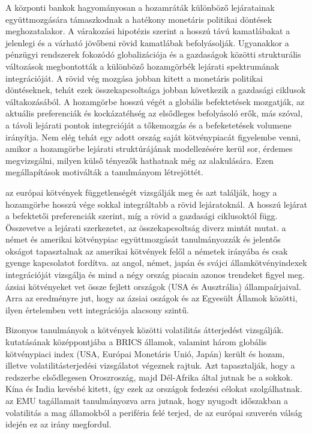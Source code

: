 \documentclass[12pt,bibliography=totoc]{article}
\begin{document}
A központi bankok hagyományosan a hozamráták különböző lejáratainak együttmozgására támaszkodnak a hatékony monetáris politikai döntések meghozatalakor. A várakozási hipotézis szerint a hosszú távú kamatlábakat a jelenlegi és a várható jövőbeni rövid kamatlábak befolyásolják. Ugyanakkor a pénzügyi rendszerek fokozódó globalizációja és a gazdaságok közötti strukturális változások megbontották a különböző hozamgörbék lejárati spektrumának integrációját. A rövid vég mozgása jobban kitett a monetáris politikai döntéseknek, tehát ezek összekapcsoltsága jobban következik a gazdasági ciklusok váltakozásából. A hozamgörbe hosszú végét a globális befektetések mozgatják, az aktuális preferenciák és kockázatéhség az elsődleges befolyásoló erők, más szóval, a távoli lejárati pontok integrcióját a tőkemozgás és a befeketetések volumene irányítja. Nem elég tehát egy adott ország saját kötvénypiacát figyelembe venni, amikor a hozamgörbe lejárati struktúrájának modellezésére kerül sor, érdemes megvizsgálni, milyen külső tényezők hathatnak még az alakulására. Ezen megállapítások motiválták a tanulmányom létrejöttét.

\cite{yang2016interdependence} az európai kötvények függetlenségét vizsgálják meg és azt találják, hogy a hozamgörbe hosszú vége sokkal integráltabb a rövid lejáratoknál. A hosszú lejárat a befektetői preferenciák szerint, míg a rövid a gazdasági ciklusoktól függ. Összevetve a lejárati szerkezetet, az összekapcsoltság diverz mintát mutat.
\cite{engsted2007comovement} a német és amerikai kötvénypiac együttmozgását tanulmányozzák és jelentős okságot tapasztalnak az amerikai kötvények felől a németek irányába és csak gyenge kapcsolatot fordítva.
\cite{davies2007international} az angol, német, japán és svájci államkötvényindexek integrációját vizsgálja és mind a négy ország piacain azonos trendeket figyel meg.
\cite{vo2009international} ázsiai kötvényeket vet össze fejlett országok (USA és Ausztrália) állampaírjaival. Arra az eredményre jut, hogy az ázsiai oszágok és az Egyesült Államok közötti, ilyen értelemben vett integrációja alacsony szintű.

Bizonyos tanulmányok a kötvények közötti volatilitás átterjedést vizsgálják. 
\cite{ahmad2018financial} kutatásának középpontjába a BRICS államok, valamint három globális kötvénypiaci index (USA, Európai Monetáris Unió, Japán) került és hozam, illetve volatilitásterjedési vizsgálatot végeznek rajtuk. Azt tapasztalják, hogy a redszerbe elsődlegesen Oroszroszág, majd Dél-Afrika által jutnak be a sokkok. Kína és India kevésbé kitett, így ezek az országok fedezési célokat szolgálhatnak.
\cite{fernandez2016using} az EMU tagállamait tanulmányozva arra jutnak, hogy nyugodt időszakban a volatilitás a mag államokból a periféria felé terjed, de az európai szuverén válság idején ez az irány megfordul.
\end{document}
